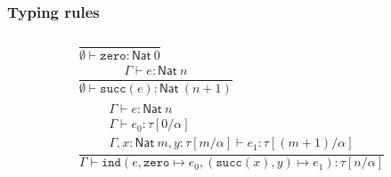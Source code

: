 \documentclass[10pt]{article}
\newcommand{\ind}[5]{\texttt{ind}(#1, \texttt{zero} \mapsto #2, (\texttt{succ}(#3), #4) \mapsto #5)}
\begin{document}
\subsubsection*{Typing rules}
\begin{align*}
\begin{array}{c}
\dfrac{}{\emptyset \vdash \texttt{zero} : \mathsf{Nat}\ 0}
\\[2em]
\dfrac{\Gamma \vdash e : \mathsf{Nat}\ n}{\emptyset \vdash \texttt{succ}(e) : \mathsf{Nat}\ (n+1)}
\\[2em]
\dfrac{\begin{array}{l}
       \Gamma \vdash e : \mathsf{Nat}\ n \\ \Gamma \vdash e_0 : \tau[0/\alpha] \\
        \Gamma, x : \mathsf{Nat}\ m, y : \tau[m/\alpha] \vdash e_1 : \tau[(m+1)/\alpha]\end{array}}
      {\Gamma \vdash \ind{e}{e_0}{x}{y}{e_1} : \tau[n/\alpha] }
\end{array}
\end{align*}
\end{document}
